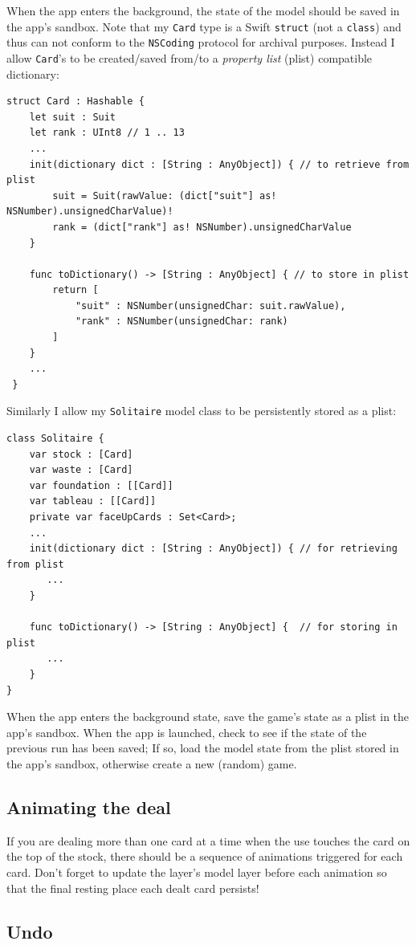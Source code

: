 \documentclass[11pt]{article}
\begin{document}
When the app enters the background, the state of the model should
be saved in the app's sandbox. 
Note that my {\tt Card} type is a Swift {\tt struct} (not a {\tt class})
and thus can not conform to the {\tt NSCoding} protocol for archival purposes.
Instead I allow {\tt Card}'s to be created/saved from/to a {\em property
list} (plist) compatible dictionary:
\begin{verbatim}
struct Card : Hashable {
    let suit : Suit
    let rank : UInt8 // 1 .. 13
    ...
    init(dictionary dict : [String : AnyObject]) { // to retrieve from plist
        suit = Suit(rawValue: (dict["suit"] as! NSNumber).unsignedCharValue)!
        rank = (dict["rank"] as! NSNumber).unsignedCharValue
    }
    
    func toDictionary() -> [String : AnyObject] { // to store in plist
        return [
            "suit" : NSNumber(unsignedChar: suit.rawValue),
            "rank" : NSNumber(unsignedChar: rank)
        ]
    }
    ...    
 }   
\end{verbatim}
Similarly I allow my {\tt Solitaire} model class to be persistently stored
as a plist:
\begin{verbatim}
class Solitaire {
    var stock : [Card]
    var waste : [Card]
    var foundation : [[Card]]
    var tableau : [[Card]]
    private var faceUpCards : Set<Card>;
    ...
    init(dictionary dict : [String : AnyObject]) { // for retrieving from plist
       ...
    }
    
    func toDictionary() -> [String : AnyObject] {  // for storing in plist
       ...
    }
}
\end{verbatim}
When the app enters the background state, save the game's state
as a plist in the app's sandbox.
When the app is launched, check to see if the state of the
previous run has been saved; If so, load the model state from
the plist stored in the app's sandbox,
otherwise create a new (random) game.

\subsection{Animating the deal}

If you are dealing more than one card at a time when 
the use touches the card on the top of the stock, there
should be a sequence of animations triggered
for each card. Don't forget to update the layer's model
layer before each animation so that the final resting
place each dealt card persists!

\subsection{Undo}
\end{document}
